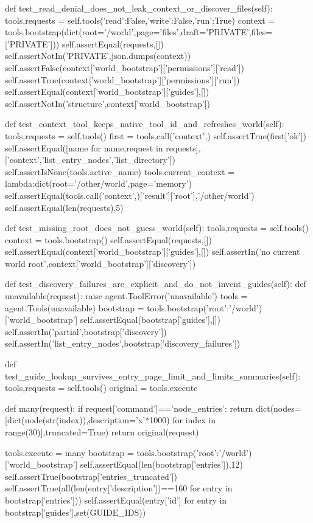     def test_read_denial_does_not_leak_context_or_discover_files(self):
        tools,requests = self.tools({'read':False,'write':False,'run':True})
        context = tools.bootstrap(dict(root='/world',page='files',draft='PRIVATE',files=['PRIVATE']))
        self.assertEqual(requests,[])
        self.assertNotIn('PRIVATE',json.dumps(context))
        self.assertFalse(context['world_bootstrap']['permissions']['read'])
        self.assertTrue(context['world_bootstrap']['permissions']['run'])
        self.assertEqual(context['world_bootstrap']['guides'],[])
        self.assertNotIn('structure',context['world_bootstrap'])

    def test_context_tool_keeps_native_tool_id_and_refreshes_world(self):
        tools,requests = self.tools()
        first = tools.call('context',{})
        self.assertTrue(first['ok'])
        self.assertEqual([name for name,request in requests],['context','list_entry_nodes','list_directory'])
        self.assertIsNone(tools.active_name)
        tools.current_context = lambda:dict(root='/other/world',page='memory')
        self.assertEqual(tools.call('context',{})['result']['root'],'/other/world')
        self.assertEqual(len(requests),5)

    def test_missing_root_does_not_guess_world(self):
        tools,requests = self.tools()
        context = tools.bootstrap({})
        self.assertEqual(requests,[])
        self.assertEqual(context['world_bootstrap']['guides'],[])
        self.assertIn('no current world root',context['world_bootstrap']['discovery'])

    def test_discovery_failures_are_explicit_and_do_not_invent_guides(self):
        def unavailable(request):
            raise agent.ToolError('unavailable')
        tools = agent.Tools(unavailable)
        bootstrap = tools.bootstrap({'root':'/world'})['world_bootstrap']
        self.assertEqual(bootstrap['guides'],[])
        self.assertIn('partial',bootstrap['discovery'])
        self.assertIn('list_entry_nodes',bootstrap['discovery_failures'])

    def test_guide_lookup_survives_entry_page_limit_and_limits_summaries(self):
        tools,requests = self.tools()
        original = tools.execute

        def many(request):
            if request['command']=='node_entries':
                return dict(nodes=[dict(node(str(index)),description='x'*1000) for index in range(30)],truncated=True)
            return original(request)

        tools.execute = many
        bootstrap = tools.bootstrap({'root':'/world'})['world_bootstrap']
        self.assertEqual(len(bootstrap['entries']),12)
        self.assertTrue(bootstrap['entries_truncated'])
        self.assertTrue(all(len(entry['description'])==160 for entry in bootstrap['entries']))
        self.assertEqual({entry['id'] for entry in bootstrap['guides']},set(GUIDE_IDS))

